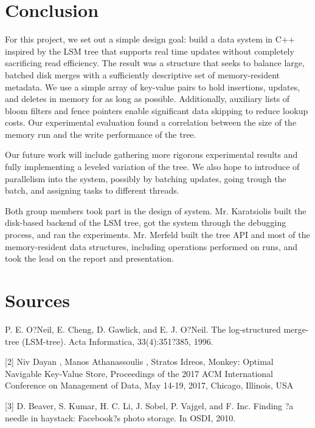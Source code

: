\documentclass[12pt]{article}
\begin{document}
\section{Conclusion}
\indent \indent For this project, we set out a simple design goal: build a data system in C++ inspired by the LSM tree that supports real time updates without completely sacrificing read efficiency. The result was a structure that seeks to balance large, batched disk merges with a sufficiently descriptive set of memory-resident metadata. We use a simple array of key-value pairs to hold insertions, updates, and deletes in memory for as long as possible. Additionally, auxiliary lists of bloom filters and fence pointers enable significant data skipping to reduce lookup costs. Our experimental evaluation found a correlation between the size of the memory run and the write performance of the tree.
	
	Our future work will include gathering more rigorous experimental results and fully implementing a leveled variation of the tree. We also hope to introduce of parallelism into the system, possibly by batching updates, going trough the batch, and assigning tasks to different threads.
	
	Both group members took part in the design of system. Mr. Karatsiolis built the disk-based backend of the LSM tree, got the system through the debugging process, and ran the experiments. Mr. Merfeld built the tree API and most of the memory-resident data structures, including operations performed on runs, and took the lead on the report and presentation.

\section*{Sources}
\indent \indent [1] P. E. O?Neil, E. Cheng, D. Gawlick, and E. J. O?Neil. The
log-structured merge-tree (LSM-tree). Acta Informatica,
33(4):351?385, 1996.

[2] Niv Dayan , Manos Athanassoulis , Stratos Idreos, Monkey: Optimal Navigable Key-Value Store, Proceedings of the 2017 ACM International Conference on Management of Data, May 14-19, 2017, Chicago, Illinois, USA

[3] D. Beaver, S. Kumar, H. C. Li, J. Sobel, P. Vajgel, and F. Inc. Finding ?a needle in haystack: Facebook?s photo storage. In OSDI, 2010.
\end{document}
